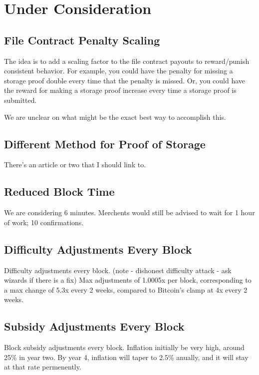 \documentclass[twocolumn]{article}
\begin{document}
\section{Under Consideration}
\subsection{File Contract Penalty Scaling}
The idea is to add a scaling factor to the file contract payouts to reward/punish consistent behavior.
For example, you could have the penalty for missing a storage proof double every time that the penalty is missed.
Or, you could have the reward for making a storage proof increase every time a storage proof is submitted.

We are unclear on what might be the exact best way to accomplish this.

\subsection{Different Method for Proof of Storage}
There's an article or two that I should link to.

\subsection{Reduced Block Time}
We are considering 6 minutes.
Merchents would still be advised to wait for 1 hour of work; 10 confirmations.

\subsection{Difficulty Adjustments Every Block}
Difficulty adjustments every block. (note - dishonest difficulty attack - ask wizards if there is a fix)
Max adjustments of 1.0005x per block, corresponding to a max change of 5.3x every 2 weeks, compared to Bitcoin's clamp at 4x every 2 weeks.

\subsection{Subsidy Adjustments Every Block}
Block subsidy adjustments every block.
Inflation initially be very high, around 25\% in year two.
By year 4, inflation will taper to 2.5\% anually, and it will stay at that rate permenently.
\end{document}

